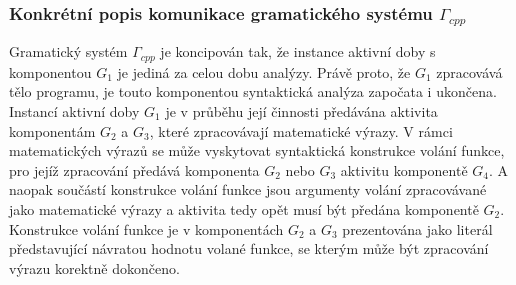 \subsubsection*{Konkrétní popis komunikace gramatického systému $\Gamma_{cpp}$}
Gramatický systém $\Gamma_{cpp}$ je koncipován tak, že instance aktivní doby s komponentou $G_1$ je jediná za celou dobu analýzy. Právě proto, že $G_1$
zpracovává tělo programu, je touto komponentou syntaktická analýza započata i ukončena. Instancí aktivní doby $G_1$ je v průběhu její činnosti
předávána aktivita komponentám $G_2$ a $G_3$, které zpracovávají matematické výrazy. V rámci matematických výrazů se může vyskytovat syntaktická
konstrukce volání funkce, pro jejíž zpracování předává komponenta $G_2$ nebo $G_3$ aktivitu komponentě $G_4$. A naopak součástí konstrukce volání funkce
jsou argumenty volání zpracovávané jako matematické výrazy a aktivita tedy opět musí být předána komponentě $G_2$. Konstrukce volání funkce je v komponentách
$G_2$ a $G_3$ prezentována jako literál představující návratou hodnotu volané funkce, se kterým může být zpracování výrazu korektně dokončeno.

